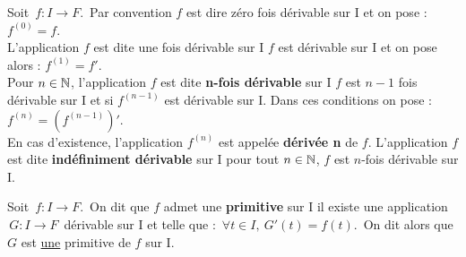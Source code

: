 \newpage

Soit \(\, f:I\to F.\,\) Par convention $f$ est dire zéro fois dérivable sur I et on pose : $f^{(0)}=f$.\vspace{0.1cm}\\
L'application $f$ est dite une fois dérivable sur I \ssi $f$ est dérivable sur I et on pose alors : $f^{(1)}=f'$.\vspace{0.1cm}\\
Pour \(n\in \mathbb{N}\)\expo{*}, l'application $f$ est dite \textbf{n-fois dérivable} sur I \ssi $f$ est $n-1$ fois dérivable sur I et si $f^{(n-1)}$ est dérivable sur I. Dans ces conditions on pose : \(f^{(n)}=\left(f^{(n-1)}\right)'.\)\vspace{0.1cm}\\
En cas d'existence, l'application $f^{(n)}$ est appelée \textbf{dérivée n} de $f$. L'application $f$ est dite \textbf{indéfiniment dérivable} sur I \ssi pour tout \(n\in \mathbb{N}\), $f$ est $n$-fois dérivable sur I. 

\vspace{1.5cm}

Soit \(\,f:I\to F.\,\) On dit que $f$ admet une \textbf{primitive} sur I \ssi il existe une application \(\,G:I\to F\,\) dérivable sur I et telle que : \(\,\forall t \in I,\ G'(t)=f(t).\,\) On dit alors que $G$ est \underline{une} primitive de $f$ sur I.

\vspace{2cm}